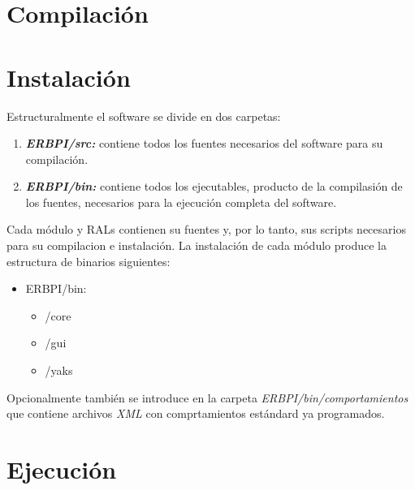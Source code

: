 
\section{Compilaci\'on}

\section{Instalaci\'on}
Estructuralmente el software se divide en dos carpetas:
\begin{enumerate}
 \item \textbf{\textit{ERBPI/src:}} contiene todos los fuentes necesarios del software para su compilaci\'on.
 \item \textbf{\textit{ERBPI/bin:}} contiene todos los ejecutables, producto de la compilasi\'on de los fuentes, necesarios para la ejecuci\'on completa del software.
\end{enumerate}

Cada m\'odulo y RALs contienen su fuentes y, por lo tanto, sus scripts necesarios para su compilacion e instalaci\'on. La instalaci\'on de cada m\'odulo produce la estructura de binarios siguientes:
\begin{itemize}
 \item ERBPI/bin:
  \begin{itemize}
    \item /core
    \item /gui
    \item /yaks
  \end{itemize}
\end{itemize}

Opcionalmente tambi\'en se introduce en la carpeta \textit{ERBPI/bin/comportamientos} que contiene archivos \textit{XML} con comprtamientos est\'andard ya programados.


\section{Ejecuci\'on}